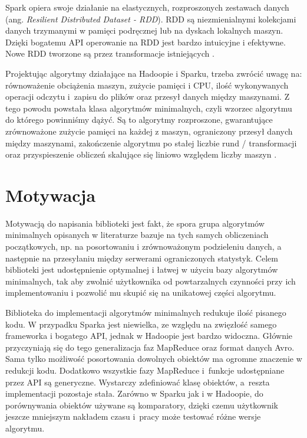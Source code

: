 \documentclass[magisterska]{pracamgr}
\begin{document}
Spark opiera swoje działanie na elastycznych, rozproszonych zestawach danych (ang. \textit{Resilient Distributed Dataset - RDD}). RDD są niezmienialnymi kolekcjami danych trzymanymi w pamięci podręcznej lub na dyskach lokalnych maszyn. Dzięki bogatemu API operowanie na RDD jest bardzo intuicyjne i efektywne. Nowe RDD tworzone są przez transformacje istniejących \cite{zaharia2010spark}.

Projektując algorytmy działające na Hadoopie i Sparku, trzeba zwrócić uwagę na: równoważenie obciążenia maszyn, zużycie pamięci i CPU, ilość wykonywanych operacji odczytu i~zapisu do plików oraz przesył danych między maszynami. Z tego powodu powstała klasa algorytmów minimalnych, czyli wzorzec algorytmu do którego powinniśmy dążyć. Są to algorytmy rozproszone, gwarantujące zrównoważone zużycie pamięci na każdej z maszyn, ograniczony przesył danych między maszynami, zakończenie algorytmu po stałej liczbie rund / transformacji oraz przyspieszenie obliczeń skalujące się liniowo względem liczby maszyn \cite{tao2013minimal}. 

\section{Motywacja}

Motywacją do napisania biblioteki jest fakt, że spora grupa algorytmów minimalnych opisanych w literaturze bazuje na tych samych obliczeniach początkowych, np. na posortowaniu i zrównoważonym podzieleniu danych, a następnie na przesyłaniu między serwerami ograniczonych statystyk. Celem biblioteki jest udostępnienie optymalnej i łatwej w użyciu bazy algorytmów minimalnych, tak aby zwolnić użytkownika od powtarzalnych czynności przy ich implementowaniu i pozwolić mu skupić się na unikatowej części algorytmu.

Biblioteka do implementacji algorytmów minimalnych redukuje ilość pisanego kodu. \linebreak W przypadku Sparka jest niewielka, ze względu na zwięzłość samego frameworka i bogatego API, jednak w Hadoopie jest bardzo widoczna. Głównie przyczyniają się do tego generalizacja faz MapReduce oraz format danych Avro. Sama tylko możliwość posortowania dowolnych obiektów ma ogromne znaczenie w redukcji kodu. Dodatkowo wszystkie fazy MapReduce i~funkcje udostępniane przez API są generyczne. Wystarczy zdefiniować klasę obiektów, a~reszta implementacji pozostaje stała. Zarówno w Sparku jak i w Hadoopie, do porównywania obiektów używane są komparatory, dzięki czemu użytkownik jeszcze mniejszym nakładem czasu i~pracy może testować różne wersje algorytmu.
\end{document}
